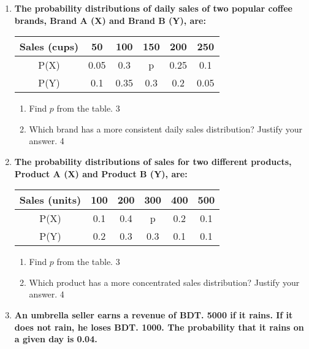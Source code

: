 \documentclass[a4paper,oneside, margin=1.4in]{book}
\begin{document}
\begin{enumerate}
  \item
	  \textbf{The probability distributions of daily sales of two popular coffee brands, Brand A (X) and Brand B (Y), are:} 
	  
	    \begin{table}[h]
	    	  \begin{center}
\begin{tabular}{c|c|c|c|c|c}
Sales (cups) & 50   & 100  & 150  & 200  & 250  \\ \hline
P(X)         & 0.05 & 0.3  & p    & 0.25 & 0.1  \\ \hline
P(Y)         & 0.1  & 0.35 & 0.3  & 0.2  & 0.05
\end{tabular}
	  \end{center}
\end{table}
  
  \begin{enumerate}
       \item  
	Find \( p \) from the table. \hfill 3
    \item
	Which brand has a more consistent daily sales distribution? Justify your answer. \hfill 4
  \end{enumerate}
  

\item
\textbf{The probability distributions of sales for two different products, Product A (X) and Product B (Y), are:} 

\begin{table}[H]
\begin{center}
\begin{tabular}{c|c|c|c|c|c}
Sales (units) & 100  & 200  & 300  & 400  & 500  \\ \hline
P(X)          & 0.1  & 0.4  & p    & 0.2  & 0.1  \\ \hline
P(Y)          & 0.2  & 0.3  & 0.3  & 0.1  & 0.1
\end{tabular}
\end{center}
\end{table}

\begin{enumerate}
    \item
    Find \( p \) from the table. \hfill 3

    \item
    Which product has a more concentrated sales distribution? Justify your answer. \hfill 4
\end{enumerate}

\item
	  \textbf{An umbrella seller earns a revenue of BDT. 5000 if it rains. If it does not rain, he loses BDT. 1000. The probability that it rains on a given day is 0.04.} 
  

\end{enumerate}
\end{document}
